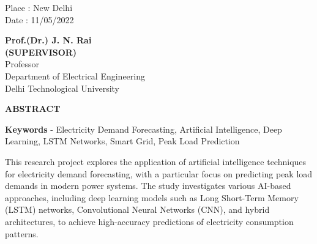 \documentclass[12pt,a4paper]{report}
\begin{document}
\noindent \begin{minipage}{4cm}
\begin{flushleft}
\vspace{1 cm}
                         
Place : New Delhi \\
Date : 11/05/2022 \\

\end{flushleft} 
\end{minipage}
\hfill
\begin{minipage}{10cm}
\begin{flushright}                                      
\vspace{2cm}
                         

\vspace{.8cm}
\textbf{Prof.(Dr.) J. N. Rai}\\
\textbf{(SUPERVISOR)}\\
Professor\\
Department of Electrical Engineering \\
Delhi Technological University\\
\end{flushright} 
\end{minipage}

\newpage


\begin{center}
 \textbf{ABSTRACT}
\end{center}

\textbf{Keywords} - Electricity Demand Forecasting, Artificial Intelligence, Deep Learning, LSTM Networks, Smart Grid, Peak Load Prediction

\vspace{0.8cm}

This research project explores the application of artificial intelligence techniques for electricity demand forecasting, with a particular focus on predicting peak load demands in modern power systems. The study investigates various AI-based approaches, including deep learning models such as Long Short-Term Memory (LSTM) networks, Convolutional Neural Networks (CNN), and hybrid architectures, to achieve high-accuracy predictions of electricity consumption patterns.
\end{document}
